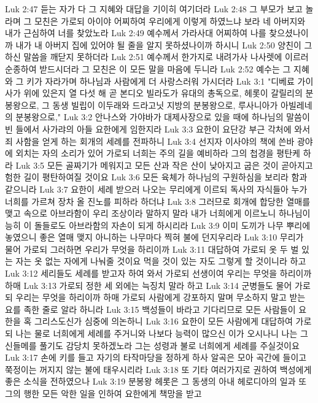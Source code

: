 Luk 2:47  듣는 자가 다 그 지혜와 대답을 기이히 여기더라
Luk 2:48  그 부모가 보고 놀라며 그 모친은 가로되 아이야 어찌하여 우리에게 이렇게 하였느냐 보라 네 아버지와 내가 근심하여 너를 찾았노라
Luk 2:49  예수께서 가라사대 어찌하여 나를 찾으셨나이까 내가 내 아버지 집에 있어야 될 줄을 알지 못하셨나이까 하시니
Luk 2:50  양친이 그 하신 말씀을 깨닫지 못하더라
Luk 2:51  예수께서 한가지로 내려가사 나사렛에 이르러 순종하여 받드시더라 그 모친은 이 모든 말을 마음에 두니라
Luk 2:52  예수는 그 지혜와 그 키가 자라가며 하나님과 사람에게 더 사랑스러워 가시더라
Luk 3:1  "디베료 가이사가 위에 있은지 열 다섯 해 곧 본디오 빌라도가 유대의 총독으로, 헤롯이 갈릴리의 분봉왕으로, 그 동생 빌립이 이두래와 드라고닛 지방의 분봉왕으로, 루사니아가 아빌레네의 분봉왕으로,"
Luk 3:2  안나스와 가야바가 대제사장으로 있을 때에 하나님의 말씀이 빈 들에서 사가랴의 아들 요한에게 임한지라
Luk 3:3  요한이 요단강 부근 각처에 와서 죄 사함을 얻게 하는 회개의 세례를 전파하니
Luk 3:4  선지자 이사야의 책에 쓴바 광야에 외치는 자의 소리가 있어 가로되 너희는 주의 길을 예비하라 그의 첩경을 평탄케 하라
Luk 3:5  모든 골짜기가 메워지고 모든 산과 작은 산이 낮아지고 굽은 것이 곧아지고 험한 길이 평탄하여질 것이요
Luk 3:6  모든 육체가 하나님의 구원하심을 보리라 함과 같으니라
Luk 3:7  요한이 세례 받으러 나오는 무리에게 이르되 독사의 자식들아 누가 너희를 가르쳐 장차 올 진노를 피하라 하더냐
Luk 3:8  그러므로 회개에 합당한 열매를 맺고 속으로 아브라함이 우리 조상이라 말하지 말라 내가 너희에게 이르노니 하나님이 능히 이 돌들로도 아브라함의 자손이 되게 하시리라
Luk 3:9  이미 도끼가 나무 뿌리에 놓였으니 좋은 열매 맺지 아니하는 나무마다 찍혀 불에 던지우리라
Luk 3:10  무리가 물어 가로되 그러하면 우리가 무엇을 하리이까
Luk 3:11  대답하여 가로되 옷 두 벌 있는 자는 옷 없는 자에게 나눠줄 것이요 먹을 것이 있는 자도 그렇게 할 것이니라 하고
Luk 3:12  세리들도 세례를 받고자 하여 와서 가로되 선생이여 우리는 무엇을 하리이까 하매
Luk 3:13  가로되 정한 세 외에는 늑징치 말라 하고
Luk 3:14  군병들도 물어 가로되 우리는 무엇을 하리이까 하매 가로되 사람에게 강포하지 말며 무소하지 말고 받는 요를 족한 줄로 알라 하니라
Luk 3:15  백성들이 바라고 기다리므로 모든 사람들이 요한을 혹 그리스도신가 심중에 의논하니
Luk 3:16  요한이 모든 사람에게 대답하여 가로되 나는 물로 너희에게 세례를 주거니와 나보다 능력이 많으신 이가 오시나니 나는 그 신들메를 풀기도 감당치 못하겠노라 그는 성령과 불로 너희에게 세례를 주실것이요
Luk 3:17  손에 키를 들고 자기의 타작마당을 정하게 하사 알곡은 모아 곡간에 들이고 쭉정이는 꺼지지 않는 불에 태우시리라
Luk 3:18  또 기타 여러가지로 권하여 백성에게 좋은 소식을 전하였으나
Luk 3:19  분봉왕 헤롯은 그 동생의 아내 헤로디아의 일과 또 그의 행한 모든 악한 일을 인하여 요한에게 책망을 받고
